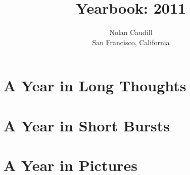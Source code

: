 \documentclass[11pt,letter]{book}
\title{Yearbook: 2011}
\author{Nolan Caudill\\San Francisco, California}
\date{}
\begin{document}
\maketitle
\tableofcontents

%

\mainmatter
\part{A Year in Long Thoughts}















%
















\part{A Year in Short Bursts}



\part{A Year in Pictures}

%

\end{document}
